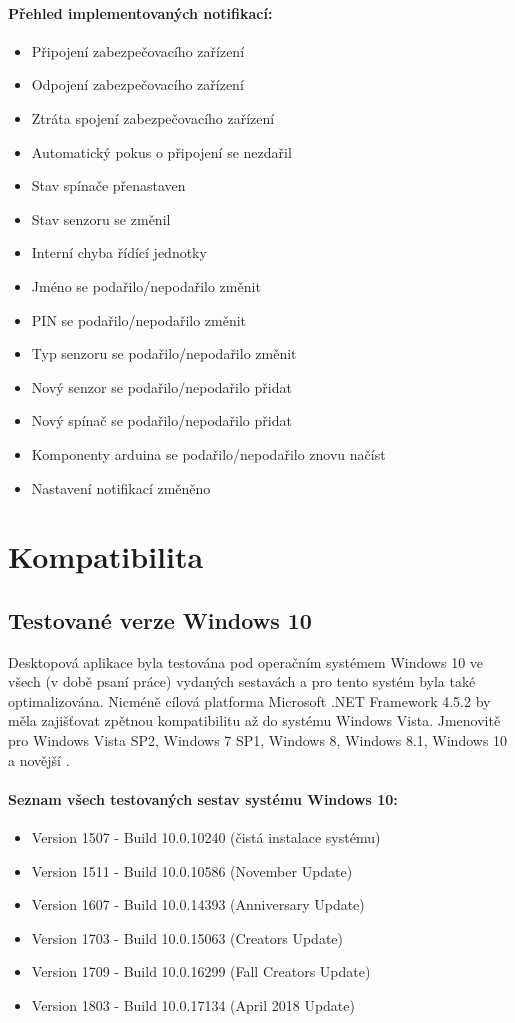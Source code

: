 \documentclass[FM,DP]{tulthesis}  %
\begin{document}
\paragraph{Přehled implementovaných notifikací:}
\begin{itemize}
\item Připojení zabezpečovacího zařízení
\item Odpojení zabezpečovacího zařízení
\item Ztráta spojení zabezpečovacího zařízení
\item Automatický pokus o připojení se nezdařil
\item Stav spínače přenastaven
\item Stav senzoru se změnil
\item Interní chyba řídící jednotky
\item Jméno se podařilo/nepodařilo změnit
\item PIN se podařilo/nepodařilo změnit
\item Typ senzoru se podařilo/nepodařilo změnit
\item Nový senzor se podařilo/nepodařilo přidat
\item Nový spínač se podařilo/nepodařilo přidat
\item Komponenty arduina se podařilo/nepodařilo znovu načíst
\item Nastavení notifikací změněno
\end{itemize} 

\section{Kompatibilita}

\subsection{Testované verze Windows 10}
Desktopová aplikace byla testována pod operačním systémem Windows 10 ve všech (v době psaní práce) vydaných sestavách a pro tento systém byla také optimalizována. Nicméně cílová platforma Microsoft .NET Framework 4.5.2 \cite{WhatsNew.NetFramework4.5.2} by měla zajišťovat zpětnou kompatibilitu až do systému Windows Vista. Jmenovitě pro Windows Vista SP2, Windows 7 SP1, Windows 8, Windows 8.1, Windows 10 a novější \cite{.NetFramework4.5.2}.

\paragraph{Seznam všech testovaných sestav systému Windows 10:}
\begin{itemize}
\item Version 1507 - Build 10.0.10240 (čistá instalace systému)
\item Version 1511 - Build 10.0.10586 (November Update)
\item Version 1607 - Build 10.0.14393 (Anniversary Update)
\item Version 1703 - Build 10.0.15063 (Creators Update)
\item Version 1709 - Build 10.0.16299 (Fall Creators Update)
\item Version 1803 - Build 10.0.17134 (April 2018 Update)
\end{itemize}
\end{document}
